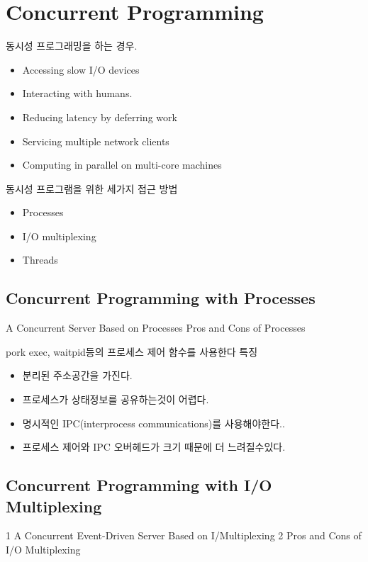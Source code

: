 
\chapter{Concurrent Programming}

동시성 프로그래밍을 하는 경우.

\begin{itemize}
    \item Accessing slow I/O devices
    \item Interacting with humans.
    \item Reducing latency by deferring work
    \item Servicing multiple network clients
    \item Computing in parallel on multi-core machines
\end{itemize}

동시성 프로그램을 위한 세가지 접근 방법
\begin{itemize}
    \item Processes
    \item I/O multiplexing
    \item Threads
\end{itemize}



\section{Concurrent Programming with Processes}
A Concurrent Server Based on Processes
Pros and Cons of Processes

pork exec, waitpid등의 프로세스 제어 함수를 사용한다
특징
\begin{itemize}
    \item 분리된 주소공간을 가진다.
    \item 프로세스가 상태정보를 공유하는것이 어렵다.
    \item 명시적인 IPC(interprocess communications)를 사용해야한다..
    \item 프로세스 제어와 IPC 오버헤드가 크기 때문에 더 느려질수있다.
\end{itemize}


\section{Concurrent Programming with I/O Multiplexing}
1 A Concurrent Event-Driven Server Based on I/Multiplexing
2 Pros and Cons of I/O Multiplexing




